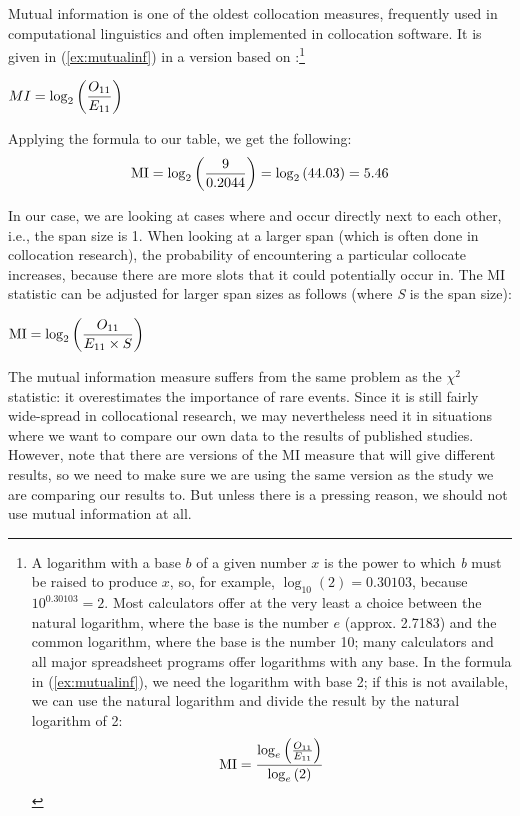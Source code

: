 Mutual information  is one of the oldest collocation  measures, frequently used in computational linguistics and often implemented in collocation software. It is given in (\ref{ex:mutualinf}) in a version based on \citet{church_word_1990}:\footnote{A logarithm  with a base $b$ of a given number $x$ is the power to which \textit{b} must be raised to produce $x$, so, for example, $\log_{10}(2) = 0.30103$, because $10^{0.30103}=2$. Most calculators offer at the very least a choice between the natural logarithm, where the base is the number $e$ (approx. 2.7183) and the common logarithm,  where the base is the number 10; many calculators and all major spreadsheet programs offer logarithms with any base. In the formula in (\ref{ex:mutualinf}), we need the logarithm with base 2; if this is not available, we can use the natural logarithm and divide the result by the natural logarithm of 2:
\[\text{MI} = {{\log_e \left( {O_{11}} \over {E_{11}} \right)} \over {\log_e \left( 2 \right)}}\]}

\begin{exe}
\ex $\displaystyle{MI = {\log_2 \left( {O_{11}} \over {E_{11}} \right)}}$
\label{ex:mutualinf}
\end{exe}
Applying the formula to our table, we get the following:
\[\text{MI} = {\log_2 \left( {9} \over {0.2044} \right) = \log_2 \left( 44.03 \right)} = 5.46\]

In our case, we are looking at cases where  and  occur directly next to each other, i.e., the span  size is 1. When looking at a larger span (which is often done in collocation  research), the probability  of encountering a particular collocate increases, because there are more slots that it could potentially occur in. The MI statistic can be adjusted for larger span sizes as follows (where \textit{S} is the span size):

\begin{exe}
\ex $\displaystyle{\text{MI} = {\log_2 \left( {O_{11}} \over {E_{11} \times S} \right)}}$
\label{ex:mutualinfspan}
\end{exe}

The mutual information  measure suffers from the same problem as the $\chi^2$  statistic:  it overestimates the importance of rare events. Since it is still fairly wide\hyp{}spread in collocational  research, we may nevertheless need it in situations where we want to compare our own data to the results of published studies. However, note that there are versions of the MI measure that will give different results, so we need to make sure we are using the same version as the study we are comparing our results to. But unless there is a pressing reason, we should not use mutual information  at all.

